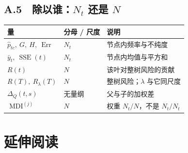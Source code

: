 \documentclass[11pt,a4paper,fontset=windows,zihao=-4]{ctexart}
\DeclareMathOperator{\SSE}{SSE}
\DeclareMathOperator{\Err}{Err}
\DeclareMathOperator{\MDI}{MDI}
\newcommand{\tabhead}{\sffamily\bfseries\color{navy}}
\begin{document}
\subsection*{A.5　除以谁：$N_t$ 还是 $N$}
\begin{center}
\small
\begin{tabular}{@{}lll@{}}
\toprule
\rowcolor{navy!7}
\tabhead 量 & \tabhead 分母 / 尺度 & \tabhead 说明\\
\midrule
$\widehat p_{tc},\ G,\ H,\ \Err$ & $N_t$ & 节点内频率与不纯度\\
$\bar y_t,\ \SSE(t)$ & $N_t$ & 节点内均值与平方和\\
$R(t)$ & $N$ & 该叶对整树风险的贡献\\
$R(T),\ R_\lambda(T)$ & $N$ & 整树风险；$\lambda$ 与它同尺度\\
$\Delta_Q(t,s)$ & 无量纲 & 父与子的加权差\\
$\MDI^{(j)}$ & $N$ & 权重 $N_t/N$，不是 $N_t/N_t$\\
\bottomrule
\end{tabular}
\end{center}

\section{延伸阅读}
\end{document}
